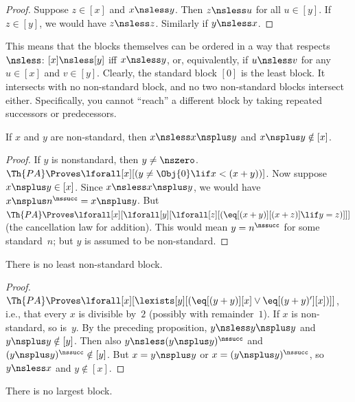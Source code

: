 \documentclass[../../../include/open-logic-section]{subfiles}
\begin{document}
\begin{proof}
Suppose $z \in [x]$ and $x \nsless y$. Then $z \nsless u$ for all $u
\in [y]$. If $z \in [y]$, we would have $z \nsless z$. Similarly if $y
\nsless x$.
\end{proof}

\begin{explain}
This means that the blocks themselves can be ordered in a way that
respects $\nsless$: $[x] \nsless [y]$ iff $x \nsless y$, or,
equivalently, if $u \nsless v$ for any $u \in [x]$ and $v \in [y]$.
Clearly, the standard block $[0]$ is the least block. It intersects
with no non-standard block, and no two non-standard blocks intersect
either. Specifically, you cannot ``reach'' a different block by taking
repeated successors or predecessors.
\end{explain}

\begin{prop}
If $x$ and $y$ are non-standard, then $x \nsless x \nsplus y$ and $x
\nsplus y \notin [x]$.
\end{prop}

\begin{proof}
If $y$ is nonstandard, then $y \neq \nszero$. $\Th{PA} \Proves
\lforall[x][(y \neq \Obj{0} \lif x < (x+y))]$.  Now suppose $x
\nsplus y \in [x]$. Since $x \nsless x \nsplus y$, we would have $x
\nsplus n^\nssucc = x \nsplus y$. But $\Th{PA} \Proves
\lforall[x][\lforall[y][\lforall[z][(\eq[(x+y)][(x+z)] \lif y = z)]]]$
(the cancellation law for addition). This would mean $y = n^\nssucc$
for some standard~$n$; but $y$ is assumed to be non-standard.
\end{proof}

\begin{prop}
There is no least non-standard block.
\end{prop}

\begin{proof}
$\Th{PA} \Proves \lforall[x][\lexists[y][(\eq[(y+y)][x] \lor
      \eq[(y+y)'][x])]]$, i.e., that every $x$ is divisible by~$2$
  (possibly with remainder~$1$). If $x$ is non-standard, so is~$y$. By
  the preceding proposition, $y \nsless y \nsplus y$ and $y \nsplus y
  \notin [y]$. Then also $y \nsless (y \nsplus y)^\nssucc$ and $(y
  \nsplus y)^\nssucc \notin [y]$. But $x = y \nsplus y$ or $x = (y
  \nsplus y)^\nssucc$, so $y \nsless x$ and $y \notin [x]$.
\end{proof}

\begin{prop}
There is no largest block.
\end{prop}
\end{document}

